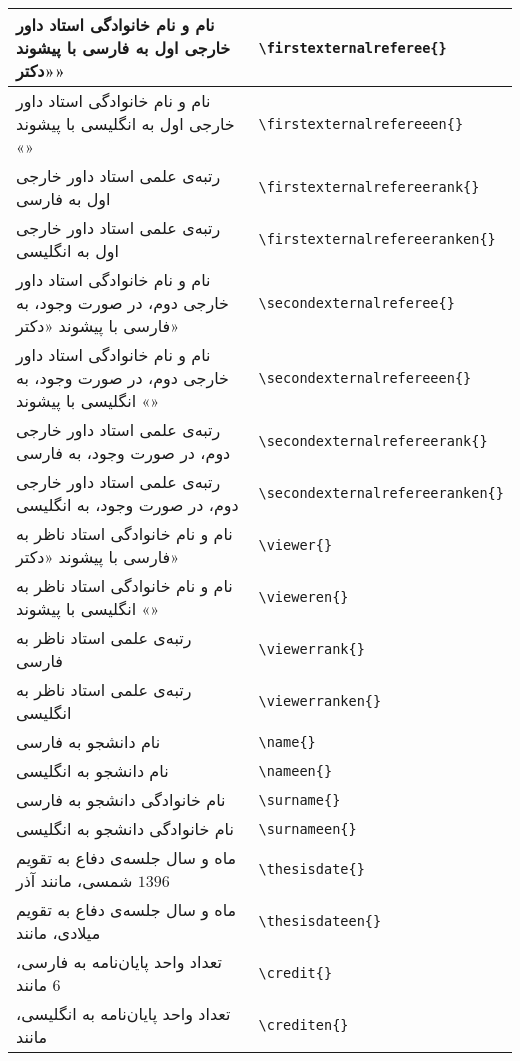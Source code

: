 \begin{longtable}[c]{| L{.45\textwidth} | R{.45\textwidth} |}
		نام و نام خانوادگی استاد داور خارجی اول به فارسی با پیشوند «دکتر» &  \verb|\firstexternalreferee{}| \\ \hline
		نام و نام خانوادگی استاد داور خارجی اول به انگلیسی با پیشوند «» &  \verb|\firstexternalrefereeen{}| \\ \hline
		رتبه‌ی علمی استاد داور خارجی اول به فارسی &  \verb|\firstexternalrefereerank{}| \\ \hline
		رتبه‌ی علمی استاد داور خارجی اول به انگلیسی &  \verb|\firstexternalrefereeranken{}| \\ \hline
		نام و نام خانوادگی استاد داور خارجی دوم، در صورت وجود، به فارسی با پیشوند «دکتر» &  \verb|\secondexternalreferee{}| \\ \hline
		نام و نام خانوادگی استاد داور خارجی دوم، در صورت وجود، به انگلیسی با پیشوند «» &  \verb|\secondexternalrefereeen{}| \\ \hline
		رتبه‌ی علمی استاد داور خارجی دوم، در صورت وجود، به فارسی &  \verb|\secondexternalrefereerank{}| \\ \hline
		رتبه‌ی علمی استاد داور خارجی دوم، در صورت وجود، به انگلیسی &  \verb|\secondexternalrefereeranken{}| \\ \hline
		نام و نام خانوادگی استاد ناظر به فارسی با پیشوند «دکتر» &  \verb|\viewer{}| \\ \hline
		نام و نام خانوادگی استاد ناظر به انگلیسی با پیشوند «» &  \verb|\vieweren{}| \\ \hline
		رتبه‌ی علمی استاد ناظر به فارسی &  \verb|\viewerrank{}| \\ \hline
		رتبه‌ی علمی استاد ناظر به انگلیسی &  \verb|\viewerranken{}| \\ \hline
		نام دانشجو به فارسی &  \verb|\name{}| \\ \hline
		نام دانشجو به انگلیسی &  \verb|\nameen{}| \\ \hline
		نام خانوادگی دانشجو به فارسی &  \verb|\surname{}| \\ \hline
		نام خانوادگی دانشجو به انگلیسی &  \verb|\surnameen{}| \\ \hline
		ماه و سال جلسه‌ی دفاع به تقویم شمسی، مانند آذر $1396$ &  \verb|\thesisdate{}| \\ \hline
		ماه و سال جلسه‌ی دفاع به تقویم میلادی، مانند  &  \verb|\thesisdateen{}| \\ \hline
		تعداد واحد پایان‌نامه به فارسی، مانند $6$ &  \verb|\credit{}| \\ \hline
		تعداد واحد پایان‌نامه به انگلیسی، مانند  &  \verb|\crediten{}| \\ \hline

\end{longtable}
